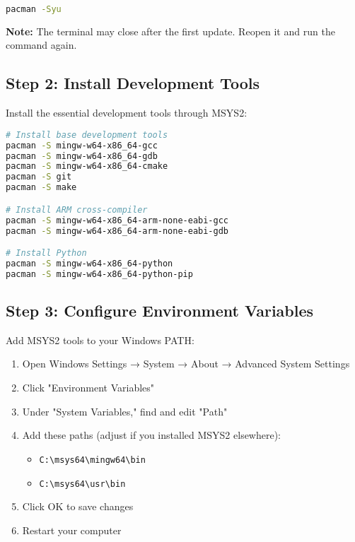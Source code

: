 \documentclass[11pt,a4paper]{article}
\begin{document}
\begin{lstlisting}[language=bash]
pacman -Syu
\end{lstlisting}

\textbf{Note:} The terminal may close after the first update. Reopen it and run the command again.

\subsection{Step 2: Install Development Tools}
Install the essential development tools through MSYS2:

\begin{lstlisting}[language=bash]
# Install base development tools
pacman -S mingw-w64-x86_64-gcc
pacman -S mingw-w64-x86_64-gdb
pacman -S mingw-w64-x86_64-cmake
pacman -S git
pacman -S make

# Install ARM cross-compiler
pacman -S mingw-w64-x86_64-arm-none-eabi-gcc
pacman -S mingw-w64-x86_64-arm-none-eabi-gdb

# Install Python
pacman -S mingw-w64-x86_64-python
pacman -S mingw-w64-x86_64-python-pip
\end{lstlisting}

\subsection{Step 3: Configure Environment Variables}
Add MSYS2 tools to your Windows PATH:

\begin{enumerate}
    \item Open Windows Settings → System → About → Advanced System Settings
    \item Click "Environment Variables"
    \item Under "System Variables," find and edit "Path"
    \item Add these paths (adjust if you installed MSYS2 elsewhere):
    \begin{itemize}
        \item \texttt{C:\textbackslash msys64\textbackslash mingw64\textbackslash bin}
        \item \texttt{C:\textbackslash msys64\textbackslash usr\textbackslash bin}
    \end{itemize}
    \item Click OK to save changes
    \item Restart your computer
\end{enumerate}
\end{document}
